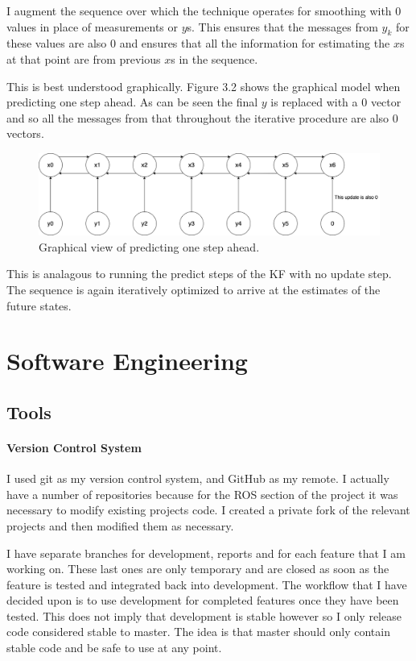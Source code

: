 \documentclass[]{../resources/final_report}
\begin{document}
I augment the sequence over which the technique operates for smoothing with $0$ values in place of measurements or $y$s. This ensures that the messages from $y_k$ for these values are also $0$ and ensures that all the information for estimating the $x$s at that point are from previous $x$s in the sequence.

This is best understood graphically. Figure 3.2 shows the graphical model when predicting one step ahead. As can be seen the final $y$ is replaced with a $0$ vector and so all the messages from that throughout the iterative procedure are also $0$ vectors.

\begin{figure}[h]
  \centering
  \includegraphics[width=\textwidth]{PredictionKalman.png}
  \caption{Graphical view of predicting one step ahead.}
  \label{}
\end{figure}

This is analagous to running the predict steps of the KF with no update step. The sequence is again iteratively optimized to arrive at the estimates of the future states.

\chapter{Software Engineering}

\section{Tools}

\subsubsection{Version Control System}

I used git as my version control system, and GitHub as my remote. I actually have a number of repositories because for the ROS section of the project it was necessary to modify existing projects code. I created a private fork of the relevant projects and then modified them as necessary.

I have separate branches for development, reports and for each feature that I am working on. These last ones are only temporary and are closed as soon as the feature is tested and integrated back into development. The workflow that I have decided upon is to use development for completed features once they have been tested. This does not imply that development is stable however so I only release code considered stable to master. The idea is that master should only contain stable code and be safe to use at any point.
\end{document}
